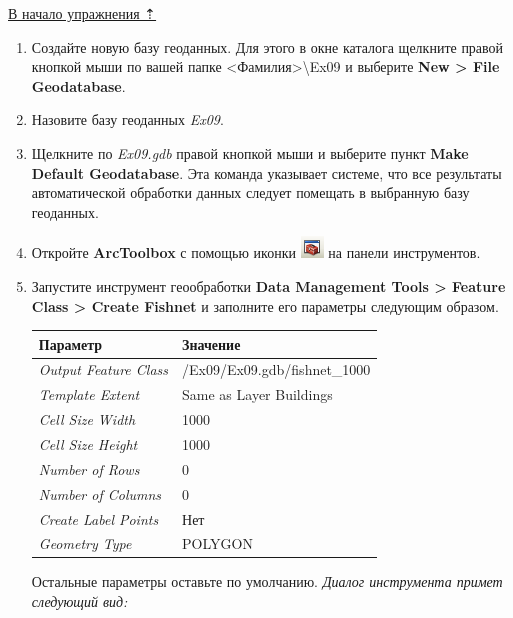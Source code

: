 \documentclass[]{book}
\theoremstyle{definition}
\theoremstyle{definition}
\theoremstyle{definition}
\theoremstyle{remark}
\begin{document}
\protect\hyperlink{land-cover-hydro}{В начало упражнения ⇡}

\begin{enumerate}
\def\labelenumi{\arabic{enumi}.}
\item
  Создайте новую базу геоданных. Для этого в окне каталога щелкните
  правой кнопкой мыши по вашей папке
  \textless{}Фамилия\textgreater{}\textbackslash{}Ex09 и выберите
  \textbf{New \textgreater{} File Geodatabase}.
\item
  Назовите базу геоданных \emph{Ex09}.
\item
  Щелкните по \emph{Ex09.gdb} правой кнопкой мыши и выберите пункт
  \textbf{Make Default Geodatabase}. Эта команда указывает системе, что
  все результаты автоматической обработки данных следует помещать в
  выбранную базу геоданных.
\item
  Откройте \textbf{ArcToolbox} с помощью иконки
  \includegraphics{images/Ex09/image7.png} на панели инструментов.
\item
  Запустите инструмент геообработки \textbf{Data Management Tools
  \textgreater{} Feature Class \textgreater{} Create Fishnet} и
  заполните его параметры следующим образом.

  \begin{longtable}[]{@{}ll@{}}
  \toprule
  Параметр & Значение\tabularnewline
  \midrule
  \endhead
  \emph{Output Feature Class} &
  /Ex09/Ex09.gdb/fishnet\_1000\tabularnewline
  \emph{Template Extent} & Same as Layer Buildings\tabularnewline
  \emph{Cell Size Width} & 1000\tabularnewline
  \emph{Cell Size Height} & 1000\tabularnewline
  \emph{Number of Rows} & 0\tabularnewline
  \emph{Number of Columns} & 0\tabularnewline
  \emph{Create Label Points} & Нет\tabularnewline
  \emph{Geometry Type} & POLYGON\tabularnewline
  \bottomrule
  \end{longtable}

  Остальные параметры оставьте по умолчанию. \emph{Диалог инструмента
  примет следующий вид:}


\end{enumerate}
\end{document}
